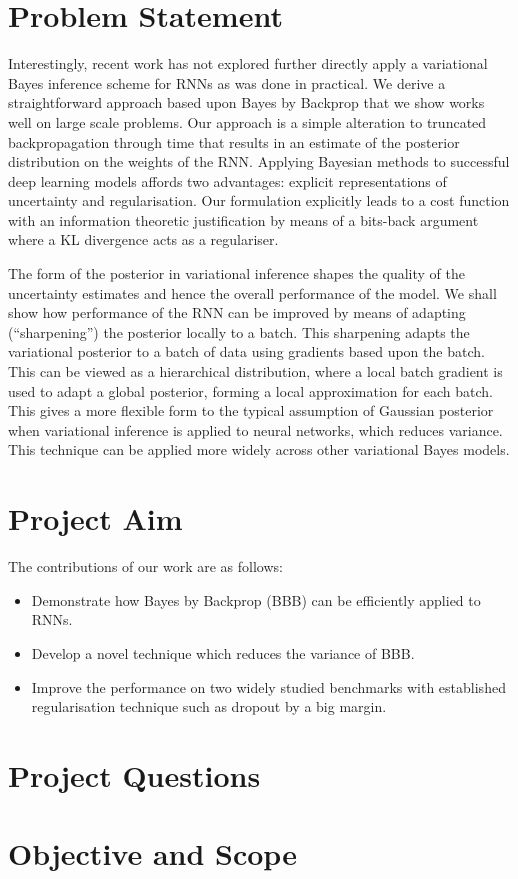 
\section{Problem Statement}

Interestingly, recent work has not explored further directly apply a variational Bayes inference scheme for RNNs as was done in practical.
We derive a straightforward approach based upon Bayes by Backprop \cite{Blundell2015a} that we show works well on large scale problems.
Our approach is a simple alteration to truncated backpropagation through time that results in an estimate of the posterior distribution on the weights of the RNN.
Applying Bayesian methods to successful deep learning models affords two advantages: explicit representations of uncertainty and regularisation.
Our formulation explicitly leads to a cost function with an information theoretic justification by means of a bits-back argument \cite{Hinton1993} where a KL divergence acts as a regulariser.

The form of the posterior in variational inference shapes the quality of the uncertainty estimates and hence the overall performance of the model.
We shall show how performance of the RNN can be improved by means of adapting (``sharpening'') the posterior locally to a batch.
This sharpening adapts the variational posterior to a batch of data using gradients based upon the batch.
This can be viewed as a hierarchical distribution, where a local batch gradient is used to adapt a global posterior, forming a local approximation for each batch.
This gives a more flexible form  to the typical assumption of Gaussian posterior when variational inference is applied to neural networks, which reduces variance. This technique can be applied more widely across other variational Bayes models.

\section{Project Aim}

The contributions of our work are as follows:
\begin{itemize}
	\item Demonstrate how Bayes by Backprop (BBB) can be efficiently applied to RNNs.
	\item Develop a novel technique which reduces the variance of BBB.
	\item Improve the performance on two widely studied benchmarks with established regularisation technique such as dropout by a big margin.
\end{itemize}

\section{Project Questions}

\section{Objective and Scope}

